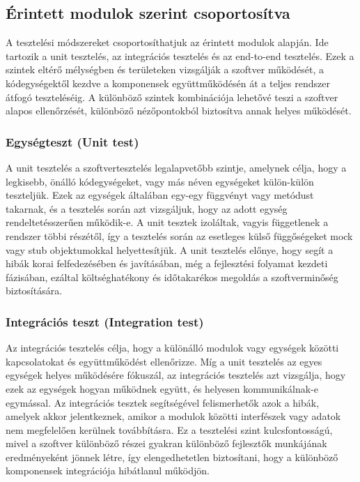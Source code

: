 \subsection{Érintett modulok szerint csoportosítva}
A tesztelési módszereket csoportosíthatjuk az érintett modulok alapján. Ide tartozik a unit tesztelés, az integrációs tesztelés és az end-to-end tesztelés.
Ezek a szintek eltérő mélységben és területeken vizsgálják a szoftver működését, a kódegységektől kezdve a komponensek együttműködésén át a teljes rendszer átfogó teszteléséig.
A különböző szintek kombinációja lehetővé teszi a szoftver alapos ellenőrzését, különböző nézőpontokból biztosítva annak helyes működését.
\subsubsection{Egységteszt (Unit test)}
A unit tesztelés a szoftvertesztelés legalapvetőbb szintje, amelynek célja, hogy a legkisebb, önálló kódegységeket, vagy más néven egységeket külön-külön teszteljük.
Ezek az egységek általában egy-egy függvényt vagy metódust takarnak, és a tesztelés során azt vizsgáljuk, hogy az adott egység rendeltetésszerűen működik-e.
A unit tesztek izoláltak, vagyis függetlenek a rendszer többi részétől, így a tesztelés során az esetleges külső függőségeket mock vagy stub objektumokkal helyettesítjük.
A unit tesztelés előnye, hogy segít a hibák korai felfedezésében és javításában, még a fejlesztési folyamat kezdeti fázisában, ezáltal költséghatékony és időtakarékos megoldás a szoftverminőség biztosítására.
\subsubsection{Integrációs teszt (Integration test)}
Az integrációs tesztelés célja, hogy a különálló modulok vagy egységek közötti kapcsolatokat és együttműködést ellenőrizze. Míg a unit tesztelés az egyes egységek helyes működésére fókuszál, 
az integrációs tesztelés azt vizsgálja, hogy ezek az egységek hogyan működnek együtt, és helyesen kommunikálnak-e egymással.
Az integrációs tesztek segítségével felismerhetők azok a hibák, amelyek akkor jelentkeznek, amikor a modulok közötti interfészek vagy adatok nem megfelelően kerülnek továbbításra. 
Ez a tesztelési szint kulcsfontosságú, mivel a szoftver különböző részei gyakran különböző fejlesztők munkájának eredményeként jönnek létre, így elengedhetetlen biztosítani, hogy a különböző komponensek integrációja hibátlanul működjön.
